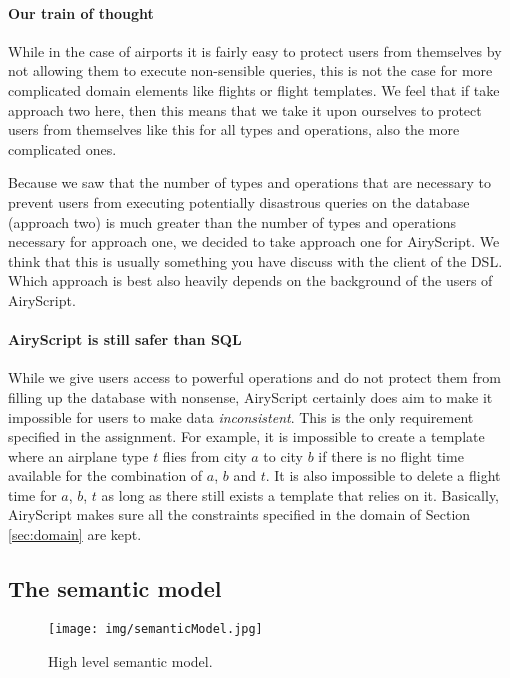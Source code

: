 \paragraph{Our train of thought}
While in the case of airports it is fairly easy to protect users from themselves
by not allowing them to execute non-sensible queries, this is not the case for
more complicated domain elements like flights or flight templates. We feel that
if take approach two here, then this means that we take it upon ourselves to
protect users from themselves like this for all types and operations, also the
more complicated ones.

Because we saw that the number of types and operations that are necessary to
prevent users from executing potentially disastrous queries on the database
(approach two) is much greater than the number of types and operations necessary
for approach one, we decided to take approach one for AiryScript. We think that
this is usually something you have discuss with the client of the DSL. Which
approach is best also heavily depends on the background of the users of
AiryScript.

\paragraph{AiryScript is still safer than SQL}
While we give users access to powerful operations and do not protect them from
filling up the database with nonsense, AiryScript certainly does aim to make it
impossible for users to make data \emph{inconsistent}. This is the only
requirement specified in the assignment. For example, it is impossible to create
a template where an airplane type $t$ flies from city $a$ to city $b$ if there
is no flight time available for the combination of $a$, $b$ and $t$. It is also
impossible to delete a flight time for $a$, $b$, $t$ as long as there still
exists a template that relies on it. Basically, AiryScript makes sure all the
constraints specified in the domain of Section \ref{sec:domain} are kept.


\subsection{The semantic model}

\begin{figure}
\texttt{[image: img/semanticModel.jpg]}
\caption{High level semantic model.}
\label{fig:semantic-model}
\end{figure}


